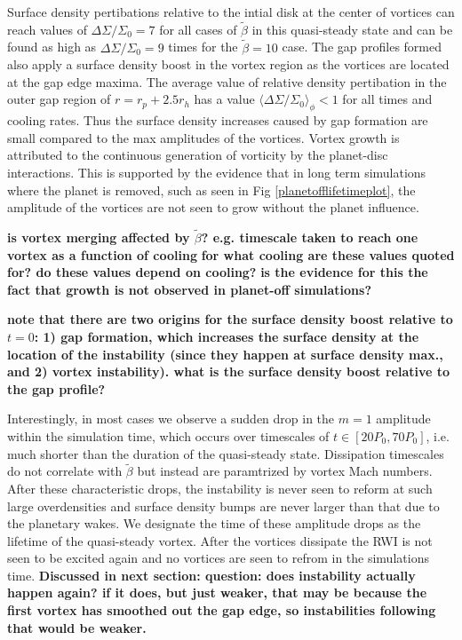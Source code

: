 Surface density pertibations relative to the intial disk
at the center of vortices can reach values of $\Delta\Sigma/\Sigma_0=7$ 
 for all cases of $\tilde\beta$ in this quasi-steady state and
can be found as high as $\Delta\Sigma/\Sigma_0= 9$ times for the 
$\tilde\beta=10$ case.
 The gap profiles formed also apply a surface density boost in the vortex 
region as the vortices are located at the gap edge maxima.
 The average value of relative density pertibation in the outer gap region of 
$r=r_{p}+2.5r_h$
has a value $\langle\Delta\Sigma/\Sigma_0\rangle_\phi<1$ for all times and
 cooling rates.
Thus the surface density increases caused by gap formation are small 
compared to the max amplitudes of the vortices.
 Vortex growth is attributed to
the continuous generation of vorticity by the planet-disc interactions. 
This is supported by the evidence that in long term simulations where the
planet is removed, such as seen in Fig \ref{planetofflifetimeplot},
 the amplitude of
 the vortices are not seen to grow without the planet influence.


{\bf is vortex merging affected by $\tilde{\beta}$? e.g. timescale
  taken to reach one vortex as a function of cooling}
{\bf for what cooling are these values quoted for? do
  these values depend on cooling?}
 {\bf is the evidence for this the fact that growth is not observed in
  planet-off simulations?}   

{\bf note that there
  are two origins for the surface density boost relative to $t=0$: 1) gap
  formation, which increases the surface density at the location of
  the instability (since they happen at surface density max., and 2)
  vortex instability). what is the surface density boost relative to
  the gap profile?}   


Interestingly, in most cases we observe a sudden drop in 
the $m=1$ amplitude within the simulation time, which occurs over
timescales of $t\in[20P_0,70P_0]$, i.e. much shorter than the duration of the
quasi-steady state. Dissipation timescales do not correlate with $\tilde\beta$
 but instead are paramtrized by vortex Mach numbers.
After these characteristic drops, the instability is never seen to
reform at such large overdensities and surface density bumps are never larger
than that due to the planetary wakes. We designate the time of these
amplitude drops as the lifetime 
of the quasi-steady vortex.
After the vortices dissipate the RWI is not seen to be excited again and no
vortices are seen to refrom in the simulations time.
{\bf Discussed in next section:  question: does instability
  actually happen again? if it does, but just weaker, that may be
  because the first vortex has smoothed out the gap edge, so
  instabilities following that would be weaker.}



